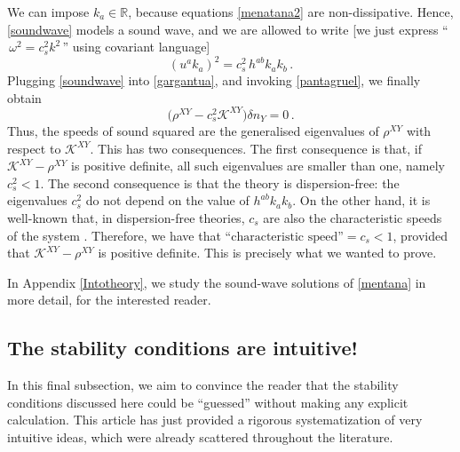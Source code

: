 \documentclass[a4paper, amsfonts, amssymb, amsmath, reprint, showkeys, nofootinbib, twoside, onecolumn,notitlepage]{revtex4-1}
\theoremstyle{definition}
\theoremstyle{theorem}
\begin{document}
We can impose $k_a \in \mathbb{R}$, because equations \eqref{menatana2} are non-dissipative. Hence, \eqref{soundwave} models a sound wave, and we are allowed to write [we just express ``$\, \omega^2 =c_s^2 k^2 \,$'' using covariant language]
\begin{equation}\label{pantagruel}
(u^a k_a)^2 = c_s^2 \, h^{ab}k_a k_b \, .
\end{equation}
Plugging \eqref{soundwave} into \eqref{gargantua}, and invoking \eqref{pantagruel}, we finally obtain
\begin{equation}\label{aragorn}
 \big( \rho^{XY} - c_s^2 \mathcal{K}^{XY} \big)\delta n_Y =0 \, .
\end{equation}
Thus, the speeds of sound squared are the generalised eigenvalues of $\rho^{XY}$ with respect to $\mathcal{K}^{XY}$. This has two consequences. The first consequence is that, if $\mathcal{K}^{XY}-\rho^{XY}$ is positive definite, all such eigenvalues are smaller than one, namely $c_s^2<1$. The second consequence is that the theory is dispersion-free: the eigenvalues $c_s^2$ do not depend on the value of $h^{ab}k_a k_b$. On the other hand, it is well-known that, in dispersion-free theories, $c_s$ are also the characteristic speeds of the system \cite{Krotscheck1978,FoxKuper1970,Rauch_book,Pu2010}. Therefore, we have that $\text{``characteristic speed''}=c_s<1$, provided that $\mathcal{K}^{XY}-\rho^{XY}$ is positive definite. This is precisely what we wanted to prove.

In Appendix \ref{Intotheory}, we study the sound-wave solutions of \eqref{mentana} in more detail, for the interested reader.


\subsection{The stability conditions are intuitive!}

In this final subsection, we aim to convince the reader that the stability conditions discussed here could be ``guessed'' without making any explicit calculation. This article has just provided a rigorous systematization of very intuitive ideas, which were already scattered throughout the literature.
\end{document}
